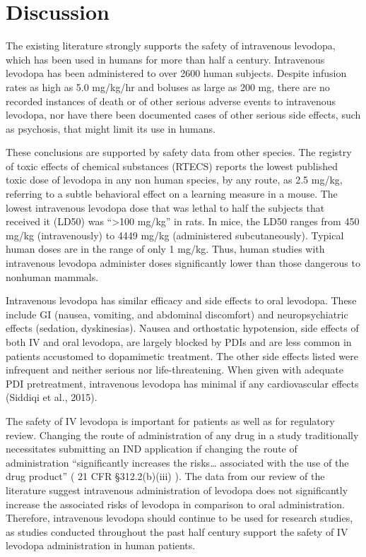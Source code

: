\section{Discussion}
The existing literature strongly supports the safety of intravenous levodopa, which has been used in humans for more than half a century\cite{14430381}.  Intravenous levodopa has been administered to over 2600 human subjects.  Despite infusion rates as high as 5.0 mg/kg/hr and boluses as large as 200 mg, there are no recorded instances of death or of other serious adverse events to intravenous levodopa, nor have there been documented cases of other serious side effects, such as psychosis, that might limit its use in humans.  

These conclusions are supported by safety data from other species. The registry of toxic effects of chemical substances (RTECS) reports the lowest published toxic dose of levodopa in any non human species, by any route, as 2.5 mg/kg, referring to a subtle behavioral effect on a learning measure in a mouse.  The lowest intravenous levodopa dose that was lethal to half the subjects that received it (LD50) was ``>100 mg/kg'' in rats.  In mice, the LD50 ranges from 450 mg/kg (intravenously) to 4449 mg/kg (administered subcutaneously).  Typical human doses are in the range of only 1 mg/kg.  Thus, human studies with intravenous levodopa administer doses significantly lower than those dangerous to nonhuman mammals. 

Intravenous levodopa has similar efficacy and side effects to oral levodopa.  These include GI (nausea, vomiting, and abdominal discomfort) and neuropsychiatric effects (sedation, dyskinesias).  Nausea and orthostatic hypotension, side effects of both IV and oral levodopa, are largely blocked by PDIs and are less common in patients accustomed to dopamimetic treatment.  The other side effects listed were infrequent and neither serious nor life-threatening. When given with adequate PDI pretreatment, intravenous levodopa has minimal if any cardiovascular effects (Siddiqi et al., 2015).

The safety of IV levodopa is important for patients as well as for regulatory review.  Changing the route of administration of any drug in a study traditionally necessitates submitting an IND application if changing the route of administration “significantly increases the risks… associated with the use of the drug product” ( 21 CFR \S 312.2(b)(iii) ).  The data from our review of the literature suggest intravenous administration of levodopa does not significantly increase the associated risks of levodopa in comparison to oral administration.  Therefore, intravenous levodopa should continue to be used for research studies, as studies conducted throughout the past half century support the safety of IV levodopa administration in human patients.